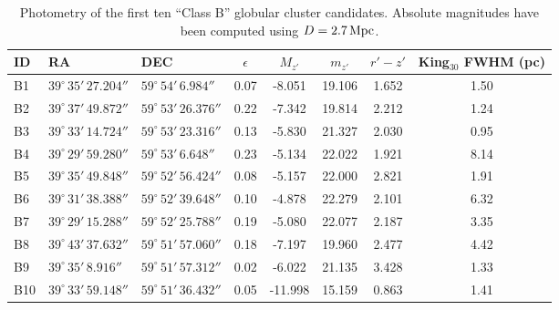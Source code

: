 \documentclass[useAMS,usenatbib]{mn2e}
\begin{document}
\begin{table}
 \centering
  \caption{Photometry of the first ten ``Class B'' globular cluster candidates. Absolute magnitudes have been computed using $D = 2.7\,\rm{Mpc}$.}
\label{tab:class_b}  
\begin{tabular}{lllccccc}
	\hline
	ID & RA & DEC & $\epsilon$ & $M_{z'}$ & $m_{z'}$ & $r'-z'$ & King$_{30}$ FWHM (pc) \\
	\hline
	B1 & $39^\circ\,35'\,27.204''$ & $59^\circ\,54'\,6.984''$ & 0.07 & -8.051 & 19.106 & 1.652 & 1.50 \\
	B2 & $39^\circ\,37'\,49.872''$ & $59^\circ\,53'\,26.376''$ & 0.22 & -7.342 & 19.814 & 2.212 & 1.24 \\
	B3 & $39^\circ\,33'\,14.724''$ & $59^\circ\,53'\,23.316''$ & 0.13 & -5.830 & 21.327 & 2.030 & 0.95 \\
	B4 & $39^\circ\,29'\,59.280''$ & $59^\circ\,53'\,6.648''$ & 0.23 & -5.134 & 22.022 & 1.921 & 8.14 \\
	B5 & $39^\circ\,35'\,49.848''$ & $59^\circ\,52'\,56.424''$ & 0.08 & -5.157 & 22.000 & 2.821 & 1.91 \\
	B6 & $39^\circ\,31'\,38.388''$ & $59^\circ\,52'\,39.648''$ & 0.10 & -4.878 & 22.279 & 2.101 & 6.32 \\
	B7 & $39^\circ\,29'\,15.288''$ & $59^\circ\,52'\,25.788''$ & 0.19 & -5.080 & 22.077 & 2.187 & 3.35 \\
	B8 & $39^\circ\,43'\,37.632''$ & $59^\circ\,51'\,57.060''$ & 0.18 & -7.197 & 19.960 & 2.477 & 4.42 \\
	B9 & $39^\circ\,35'\,8.916''$ & $59^\circ\,51'\,57.312''$ & 0.02 & -6.022 & 21.135 & 3.428 & 1.33 \\
	B10 & $39^\circ\,33'\,59.148''$ & $59^\circ\,51'\,36.432''$ & 0.05 & -11.998 & 15.159 & 0.863 & 1.41 \\
	\hline
\end{tabular}
\end{table}

\bsp
\label{lastpage}
\end{document}
